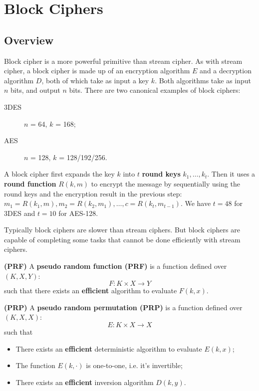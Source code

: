  \ifx\PREAMBLE\undefined


\fi
\chapter{Block Ciphers}
\section{Overview}
Block cipher is a more powerful primitive than stream cipher. As with stream cipher, a block cipher is made up of an encryption algorithm $E$ and a decryption algorithm $D$, both of which take as input a key $k$. Both algorithms take as input $n$ bits, and output $n$ bits. There are two canonical examples of block ciphers:
\begin{description}
\item[3DES]$n$ = 64, $k$ = 168;
\item[AES]$n$ = 128, $k$ = 128/192/256.
\end{description}
A block cipher first expands the key $k$ into $t$ \textbf{round keys} $k_1,\dots,k_t$. Then it uses a \textbf{round function} $R(k,m)$ to encrypt the message by sequentially using the round keys and the encryption result in the previous step: $m_1=R(k_1,m),m_2=R(k_2,m_1),\dots,c=R(k_t,m_{t-1})$. We have $t=48$ for 3DES and $t=10$ for AES-128.

Typically block ciphers are slower than stream ciphers. But block ciphers are capable of completing some tasks that cannot be done efficiently with stream ciphers.

\begin{definition}\textbf{(PRF)}
A \textbf{pseudo random function (PRF)} is a function defined over $(K,X,Y)$:
\[F:K\times X\rightarrow Y\]
such that there exists an  \textbf{efficient} algorithm to evaluate $F(k,x)$. 
\end{definition}
\begin{definition}\textbf{(PRP)}
A \textbf{pseudo random permutation (PRP)} is a function defined over $(K,X,X)$:
\[E:K\times X\rightarrow X\]
such that 
\begin{itemize}
\item There exists an \textbf{efficient} deterministic algorithm to evaluate $E(k,x)$;
\item The function $E(k,\cdot)$ is one-to-one, i.e. it's invertible;
\item There exists an \textbf{efficient} inversion algorithm $D(k,y)$.
\end{itemize}
\end{definition}

